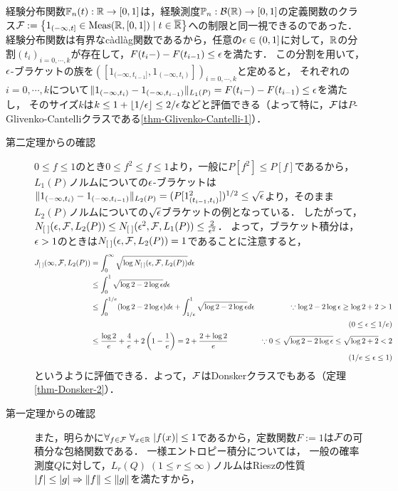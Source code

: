 \documentclass[uplatex,dvipdfmx]{jsreport}
\begin{document}
\begin{example}[区間の定義関数クラス]
    経験分布関数$\mathbb{F}_n(t):\mathbb{R}\to[0,1]$は，経験測度$\mathbb{P}_n:\mathcal{B}(\mathbb{R})\to[0,1]$の定義関数のクラス$\mathcal{F}:=\left\{1_{(-\infty,t]}\in\mathrm{Meas}(\mathbb{R},[0,1])\mid t\in\overline{\mathbb{R}}\right\}$への制限と同一視できるのであった．
    経験分布関数は有界なcàdlàg関数であるから，任意の$\epsilon\in(0,1]$に対して，$\mathbb{R}$の分割$(t_i)_{i=0,\cdots,k}$が存在して，$F(t_i-)-F(t_{i-1})\le\epsilon$を満たす．
    この分割を用いて，$\epsilon$-ブラケットの族を$([1_{(-\infty,t_{i-1}]},1_{(-\infty,t_i)}])_{i=0,\cdots,k}$と定めると，
    それぞれの$i=0,\cdots,k$について$\|1_{(-\infty,t_i)}-1_{(-\infty,t_{i-1})}\|_{L_1(P)}=F(t_i-)-F(t_{i-1})\le\epsilon$を満たし，
    そのサイズ$k$は$k\le 1+\lfloor1/\epsilon\rfloor\le2/\epsilon$などと評価できる（よって特に，$\mathcal{F}$は$P$-Glivenko-Cantelliクラスである\ref{thm-Glivenko-Cantelli-1}）．
    \begin{description}
        \item[第二定理からの確認] 
    $0\le f\le 1$のとき$0\le f^2\le f\le 1$より，一般に$P[f^2]\le P[f]$であるから，
    $L_1(P)$ノルムについての$\epsilon$-ブラケットは$\|1_{(-\infty,t_i)}-1_{(-\infty,t_{i-1})}\|_{L_2(P)}=(P[1_{(t_{i-1},t_i)}^2])^{1/2}\le\sqrt{\epsilon}$より，そのまま$L_2(P)$ノルムについての$\sqrt{\epsilon}$ブラケットの例となっている．
    したがって，$N_{[\;]}(\epsilon,\mathcal{F},L_2(P))\le N_{[\;]}(\epsilon^2,\mathcal{F},L_1(P))\le\frac{2}{\epsilon^2}$．
    よって，ブラケット積分は，$\epsilon>1$のときは$N_{[\;]}(\epsilon,\mathcal{F},L_2(P))=1$であることに注意すると，
    \begin{align*}
        J_{[\;]}(\infty,\mathcal{F},L_2(P))&=\int^\infty_0\sqrt{\log N_{[\;]}(\epsilon,\mathcal{F},L_2(P))}d\epsilon\\
        &\le\int^{1}_0\sqrt{\log 2-2\log\epsilon}d\epsilon\\
        &\le\int^{1/e}_0(\log 2-2\log\epsilon)d\epsilon+\int^1_{1/e}\sqrt{\log 2-2\log\epsilon}d\epsilon&\because \log 2-2\log\epsilon\ge\log 2+2>1\\ &&(0\le\epsilon\le 1/e)\\
        &\le\frac{\log 2}{e}+\frac{4}{e}+2\left(1-\frac{1}{e}\right)=2+\frac{2+\log2}{e}&\because0\le\sqrt{\log2-2\log\epsilon}\le\sqrt{\log2+2}<2\\ &&(1/e\le\epsilon\le1)\\
    \end{align*}
    というように評価できる．よって，$\mathcal{F}$はDonskerクラスでもある（定理\ref{thm-Donsker-2}）．
    \item[第一定理からの確認]
    また，明らかに$\forall_{f\in\mathcal{F}}\;\forall_{x\in\mathbb{R}}\;\lvert f(x)\rvert\le 1$であるから，定数関数$F:=1$は$\mathcal{F}$の可積分な包絡関数である．
    一様エントロピー積分については，
    一般の確率測度$Q$に対して，$L_r(Q)\;(1\le r\le\infty)$ノルムはRieszの性質$\lvert f\rvert\le\lvert g\rvert\Rightarrow\|f\|\le\|g\|$を満たすから，

\end{description}
\end{example}
\end{document}
